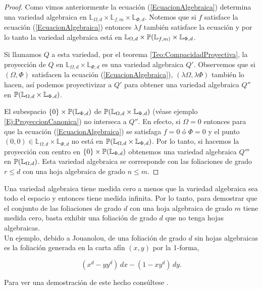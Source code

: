\begin{proof}
Como vimos anteriormente la ecuación (\ref{EcuacionAlgebraica}) determina una variedad algebraica en $\mathbb{L}_{\Omega,d}\times\mathbb{L}_{f,m}\times\mathbb{L}_{\Phi,d}$. Notemos que si $f$ satisface la ecuación (\ref{EcuacionAlgebraica}) entonces $\lambda f$ también satisface la ecuación y por lo tanto la variedad algebraica está en $\mathbb{L}_{\Omega,d}\times\mathbb{P}(\mathbb{L}_{f,m)}\times\mathbb{L}_{\Phi,d}$.

 Si llamamos $Q$ a esta variedad, por el teorema \ref{Teo:CompacidadProyectiva}, la proyección de $Q$ en $\mathbb{L}_{\Omega,d}\times\mathbb{L}_{\Phi,d}$ es una variedad algebraica $Q'$. Observemos que si $(\Omega,\Phi)$ satisfacen la ecuación (\ref{EcuacionAlgebraica}), $(\lambda\Omega,\lambda\Phi)$ también lo hacen, así podemos proyectivizar a $Q'$ para obtener una variedad algebraica $Q''$ en $\mathbb{P}(\mathbb{L}_{\Omega,d}\times\mathbb{L}_{\Phi,d})$.

El subespacio $\{0\}\times\mathbb{P}(\mathbb{L}_{\Phi,d})$ de $\mathbb{P}(\mathbb{L}_{\Omega,d}\times\mathbb{L}_{\Phi,d})$ (véase ejemplo \ref{Ej:ProyeccionCanonica}) no interseca a $Q''$. En efecto, si $\Omega=0$ entonces para que la ecuación (\ref{EcuacionAlgebraica}) se satisfaga $f=0$ ó $\Phi=0$ y el punto $(0,0)\in\mathbb{L}_{\Omega,d}\times\mathbb{L}_{\Phi,d}$ no está en $\mathbb{P}(\mathbb{L}_{\Omega,d}\times\mathbb{L}_{\Phi,d})$. Por lo tanto, si hacemos la proyección con centro en $\{0\}\times\mathbb{P}(\mathbb{L}_{\Phi,d})$ obtenemos una variedad algebraica $Q'''$ en $\mathbb{P}(\mathbb{L}_{\Omega,d})$. Esta variedad algebraica se corresponde con las foliaciones de grado $r\leq d$ con una hoja algebraica de grado $n\leq m$.  
\end{proof}

Una variedad algebraica tiene medida cero a menos que la variedad algebraica sea todo el espacio y entonces tiene medida infinita. Por lo tanto, para demostrar que  el conjunto de las foliaciones de grado $d$ con una hoja algebraica de grado $m$ tiene medida cero, basta exhibir una foliación de grado $d$ que no tenga hojas algebraicas.\\

Un ejemplo, debido a Jouanolou, de una foliación de grado $d$ sin hojas algebraicas es la foliación generada en la carta afín $(x,y)$ por la 1-forma,

$$(x^{d}-yy^{d})\, dx-(1-xy^{d})\, dy.$$

Para ver una demostración de este hecho consúltese \cite{IlyaYako}.


